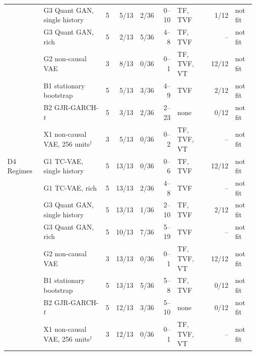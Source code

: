 \begin{tabular}{llrrrrlrl}
 & G3 Quant GAN, single history & 5 & 5/13 & 2/36 & 0--10 & TF, TVF & 1/12 & not fit \\
 & G3 Quant GAN, rich & 5 & 2/13 & 5/36 & 4--8 & TF, TVF & -- & not fit \\
 & G2 non-causal VAE & 3 & 8/13 & 0/36 & 0--1 & TF, TVF, VT & 12/12 & not fit \\
 & B1 stationary bootstrap & 5 & 5/13 & 3/36 & 4--9 & TVF & 2/12 & not fit \\
 & B2 GJR-GARCH-$t$ & 5 & 3/13 & 2/36 & 2--23 & none & 0/12 & not fit \\
 & X1 non-causal VAE, 256 units$^{\dagger}$ & 3 & 5/13 & 0/36 & 0--2 & TF, TVF, VT & -- & not fit \\
\addlinespace
D4 Regimes & G1 TC-VAE, single history & 5 & 13/13 & 0/36 & 0--6 & TF, TVF & 12/12 & not fit \\
 & G1 TC-VAE, rich & 5 & 13/13 & 2/36 & 4--8 & TVF & -- & not fit \\
 & G3 Quant GAN, single history & 5 & 13/13 & 1/36 & 2--10 & TF, TVF & 2/12 & not fit \\
 & G3 Quant GAN, rich & 5 & 10/13 & 7/36 & 5--19 & TVF & -- & not fit \\
 & G2 non-causal VAE & 3 & 13/13 & 0/36 & 0--1 & TF, TVF, VT & 12/12 & not fit \\
 & B1 stationary bootstrap & 5 & 13/13 & 5/36 & 5--8 & TF, TVF & 0/12 & not fit \\
 & B2 GJR-GARCH-$t$ & 5 & 12/13 & 3/36 & 5--10 & none & 0/12 & not fit \\
 & X1 non-causal VAE, 256 units$^{\dagger}$ & 3 & 12/13 & 0/36 & 0--1 & TF, TVF, VT & -- & not fit \\
\bottomrule
\end{tabular}
